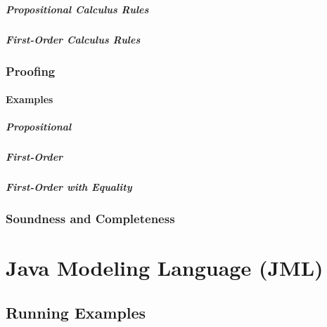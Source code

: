 \documentclass[a4paper, 11pt, accentcolor = tud3b]{tudreport}
\begin{document}
			\paragraph{Propositional Calculus Rules} %

			\paragraph{First-Order Calculus Rules} %

			\subsection{Proofing} %

				\subsubsection{Examples} %

					\paragraph{Propositional} %

					\paragraph{First-Order} %

					\paragraph{First-Order with Equality} %

			\subsection{Soundness and Completeness} %

	\chapter{Java Modeling Language (JML)} %

		\section{Running Examples} %
\end{document}
